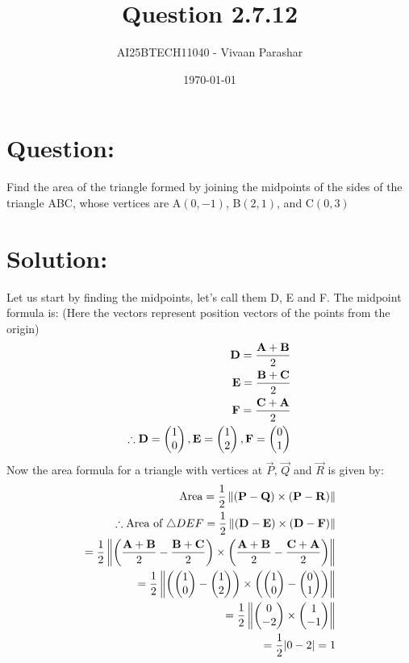 \documentclass[a4paper, 12pt]{article}
\title{Question 2.7.12}
\author{AI25BTECH11040 - Vivaan Parashar}
\date{\today}
\begin{document}
\maketitle

\section{Question: }
Find the area of the triangle formed by joining the midpoints of the sides of the triangle ABC, whose vertices are A$(0, -1)$, B$(2, 1)$, and C$(0, 3)$

\section{Solution: }
Let us start by finding the midpoints, let's call them D, E and F.
The midpoint formula is: (Here the vectors represent position vectors of the points from the origin)
\begin{align}
    \mathbf{D} = \frac{\mathbf{A}+\mathbf{B}}{2} \\
    \mathbf{E} = \frac{\mathbf{B}+\mathbf{C}}{2} \\
    \mathbf{F} = \frac{\mathbf{C}+\mathbf{A}}{2} \\
    \therefore \mathbf{D} = \begin{pmatrix}1       \\ 0\end{pmatrix}, \mathbf{E} = \begin{pmatrix}1 \\ 2\end{pmatrix}, \mathbf{F} = \begin{pmatrix}0 \\ 1\end{pmatrix}
\end{align}
Now the area formula for a triangle with vertices at $\vec{P}$, $\vec{Q}$ and $\vec{R}$ is given by:
\begin{align}
    \text{Area} = \frac{1}{2} \left\lVert(\mathbf{P} - \mathbf{Q}) \times (\mathbf{P} - \mathbf{R}) \right\rVert                                                                                        \\
    \therefore \text{Area of } \triangle DEF = \frac{1}{2} \left\lVert(\mathbf{D} - \mathbf{E}) \times (\mathbf{D} - \mathbf{F}) \right\rVert                                                           \\
    = \frac{1}{2} \left\lVert\left( \frac{\mathbf{A}+\mathbf{B}}{2} - \frac{\mathbf{B}+\mathbf{C}}{2} \right) \times \left( \frac{\mathbf{A} + \mathbf{B}}{2} - \frac{\mathbf{C}+\mathbf{A}}{2}\right) \right\rVert \\
    = \frac{1}{2} \left\lVert\left( \begin{pmatrix}1                                                                                                                                     \\ 0\end{pmatrix} - \begin{pmatrix}1 \\ 2\end{pmatrix} \right) \times \left( \begin{pmatrix}1 \\ 0\end{pmatrix} - \begin{pmatrix}0 \\ 1\end{pmatrix} \right) \right\rVert\\
    = \frac{1}{2} \left\lVert\begin{pmatrix}0                                                                                                                                            \\ -2\end{pmatrix} \times \begin{pmatrix}1 \\ -1\end{pmatrix} \right\rVert\\
    = \frac{1}{2} |0 - 2| = 1
\end{align}
\end{document}
